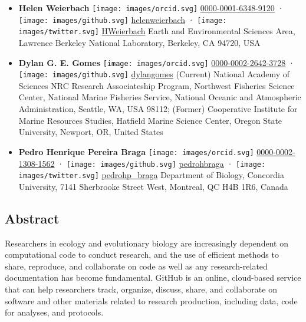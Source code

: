 \begin{itemize}
\item
  \textbf{Helen Weierbach}
  \texttt{[image: images/orcid.svg]}
  \href{https://orcid.org/0000-0001-6348-9120}{0000-0001-6348-9120}
  · \texttt{[image: images/github.svg]}
  \href{https://github.com/helenweierbach}{helenweierbach}
  · \texttt{[image: images/twitter.svg]}
  \href{https://twitter.com/HWeierbach}{HWeierbach}
  Earth and Environmental Sciences Area, Lawrence Berkeley National Laboratory, Berkeley, CA 94720, USA
\item
  \textbf{Dylan G. E. Gomes}
  \texttt{[image: images/orcid.svg]}
  \href{https://orcid.org/0000-0002-2642-3728}{0000-0002-2642-3728}
  · \texttt{[image: images/github.svg]}
  \href{https://github.com/dylangomes}{dylangomes}
  (Current) National Academy of Sciences NRC Research Associateship Program, Northwest Fisheries Science Center, National Marine Fisheries Service, National Oceanic and Atmospheric Administration, Seattle, WA, USA 98112; (Former) Cooperative Institute for Marine Resources Studies, Hatfield Marine Science Center, Oregon State University, Newport, OR, United States
\item
  \textbf{Pedro Henrique Pereira Braga}
  \texttt{[image: images/orcid.svg]}
  \href{https://orcid.org/0000-0002-1308-1562}{0000-0002-1308-1562}
  · \texttt{[image: images/github.svg]}
  \href{https://github.com/pedrohbraga}{pedrohbraga}
  · \texttt{[image: images/twitter.svg]}
  \href{https://twitter.com/pedrohp_braga}{pedrohp\_braga}
  Department of Biology, Concordia University, 7141 Sherbrooke Street West, Montreal, QC H4B 1R6, Canada
\end{itemize}

\hypertarget{abstract}{%
\subsection{Abstract}\label{abstract}}

Researchers in ecology and evolutionary biology are increasingly dependent on computational code to conduct research, and the use of efficient methods to share, reproduce, and collaborate on code as well as any research-related documentation has become fundamental.
GitHub is an online, cloud-based service that can help researchers track, organize, discuss, share, and collaborate on software and other materials related to research production, including data, code for analyses, and protocols.

